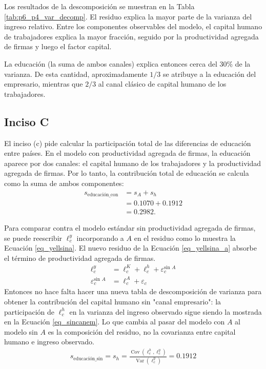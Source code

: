 Los resultados de la descomposición se muestran en la Tabla \ref{tab:p6_p4_var_decomp}. El residuo explica la mayor parte de la varianza del ingreso relativo. Entre los componentes observables del modelo, el capital humano de trabajadores explica la mayor fracción, seguido por la productividad agregada de firmas y luego el factor capital.

La educación (la suma de ambos canales) explica entonces cerca del 30\% de la varianza. De esta cantidad, aproximadamente $1/3$ se atribuye a la educación del empresario, mientras que $2/3$ al canal clásico de capital humano de los trabajadores. 



\subsection{Inciso C}

El inciso (c) pide calcular la participación total de las diferencias de educación entre países. En el modelo con productividad agregada de firmas, la educación aparece por dos canales: el capital humano de los trabajadores y la productividad agregada de firmas. Por lo tanto, la contribución total de educación se calcula como la suma de ambos componentes:
\begin{align}
	s_{\text{educación\_con}} \nonumber
	&=
	s_A + s_h \nonumber \\
	&=
	0.1070 + 0.1912 \nonumber \\
	&=
	0.2982.
\end{align}

Para comparar contra el modelo estándar sin productividad agregada de firmas, se puede reescribir $\ell_c^y$ incorporando a $A$ en el residuo como lo muestra la Ecuación \ref{eq_yellsina}. El nuevo residuo de la Ecuación \ref{eq_yellsina_a} absorbe el término de productividad agregada de firmas.
\begin{align}
	\ell^y_c
	&=
	\ell^K_c
	+
	\ell^h_c
	+
	\varepsilon^{\text{sin } A}_c \label{eq_yellsina} \\
	\varepsilon^{\text{sin } A}_c
	&=
	\ell^A_c
	+
	\varepsilon_c \label{eq_yellsina_a}
\end{align}
Entonces no hace falta hacer una nueva tabla de descomposición de varianza para obtener la contribución del capital humano sin "canal empresario": la participación de $\ell^h_c$ en la varianza del ingreso observado sigue siendo la mostrada en la Ecuación \ref{eq_sincanem}. Lo que cambia al pasar del modelo con $A$ al modelo sin $A$ es la composición del residuo, no la covarianza entre capital humano e ingreso observado.
\begin{align}
	s_{\text{educación\_sin}}
	=
	s_h
	=
	\frac{\operatorname{Cov}(\ell^h_c,\ell^y_c)}
	{\operatorname{Var}(\ell^y_c)}
	=
	0.1912 \label{eq_sincanem}
\end{align}


